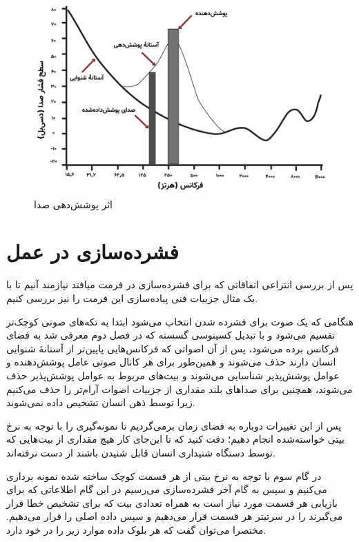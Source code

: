  \begin{figure}[]
         \centering
         \includegraphics[width=\textwidth]{figs/masking_effect.png}
         \caption[اثر پوشش‌دهی صدا]{اثر پوشش‌دهی صدا \cite{audio_masking}}
         \label{masking_effect}
 \end{figure}

 \section{فشرده‌سازی  در عمل}

 پس از بررسی انتزاعی اتفاقاتی که برای فشرده‌سازی در فرمت  میافتد نیازمند آنیم تا 
 با یک مثال جزییات فنی پیاده‌سازی این فرمت را نیز بررسی کنیم. 

 هنگامی که یک صوت برای فشرده‌ شدن انتخاب می‌شود ابتدا به تکه‌های صوتی کوچک‌تر تقسیم می‌شود و با تبدیل کسینوسی گسسته که در فصل 
 دوم معرفی شد به فضای فرکانس برده می‌شود، پس از آن اصواتی که فرکانس‌هایی پایین‌تر از آستانهٔ شنوایی انسان دارند حذف می‌شوند و همین‌طور برای
 هر کانال صوتی عامل پوشش‌دهنده   و عوامل پوشش‌پذیر 
 شناسایی می‌شوند و بیت‌های مربوط به عوامل پوشش‌پذیر حذف می‌شوند، همچنین برای صداهای بلند مقداری از جزییات اصوات آرام‌تر را حذف می‌کنیم زیرا
 توسط ذهن انسان تشخیص داده نمی‌شوند. 

  پس از این تغییرات دوباره به فضای زمان برمی‌گردیم تا نمونه‌گیری را با توجه به 
 نرخ بیتی خواسته‌شده انجام دهیم؛ دقت کنید که تا این‌جای کار هیچ مقداری از بیت‌هایی که توسط دستگاه شنیداری انسان قابل شنیدن باشند از دست نرفته‌اند.

 در گام سوم با توجه به نرخ بیتی از هر قسمت کوچک ساخته شده نمونه برداری می‌کنیم و سپس به گام آخر فشرده‌سازی می‌رسیم
 در این گام اطلاعاتی که برای بازیابی هر قسمت مورد نیاز است به همراه تعدادی بیت که برای تشخیص خطا قرار می‌گیرند را در سرتیتر
 هر قسمت قرار می‌دهیم و سپس داده اصلی را قرار می‌دهیم. مختصرا می‌توان گفت که هر بلوک داده موارد زیر را در خود دارد. 

